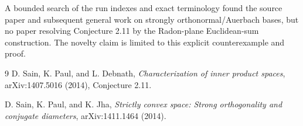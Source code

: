 \documentclass[11pt]{article}
\begin{document}
A bounded search of the run indexes and exact terminology found the source
paper and subsequent general work on strongly orthonormal/Auerbach bases, but
no paper resolving Conjecture 2.11 by the Radon-plane Euclidean-sum
construction.  The novelty claim is limited to this explicit counterexample
and proof.

\begin{thebibliography}{9}
D. Sain, K. Paul, and L. Debnath,
\emph{Characterization of inner product spaces}, arXiv:1407.5016 (2014),
Conjecture 2.11.

D. Sain, K. Paul, and K. Jha,
\emph{Strictly convex space: Strong orthogonality and conjugate diameters},
arXiv:1411.1464 (2014).
\end{thebibliography}
\end{document}
